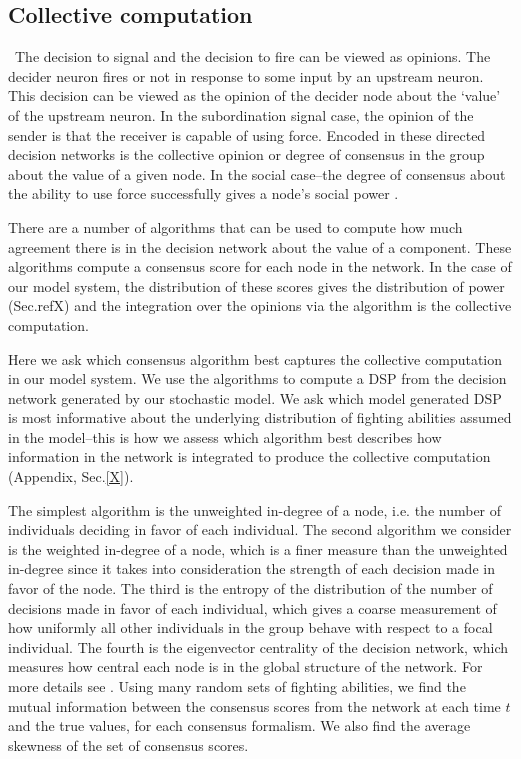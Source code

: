 \documentclass{article}
\begin{document}
\subsection*{Collective computation }
\label{computation}
\ The decision to signal and the decision to fire can be viewed as opinions. The decider neuron fires or not in response to some input by an upstream neuron. This decision can be viewed as the opinion of the decider node about the `value' of the upstream neuron. In the subordination signal case, the opinion of the sender is that the receiver is capable of using force. Encoded in these directed decision networks is the collective opinion or degree of consensus in the group about the value of a given node. In the social case--the degree of consensus about the ability to use force successfully gives a node's social power \cite{Brush:2013fk, Flack:2006uq}.

There are a number of algorithms that can be used to compute how much agreement there is in the decision network about the value of a component. These algorithms compute a consensus score for each node in the network. In the case of our model system, the distribution of these scores gives the distribution of power (Sec.refX) and the integration over the opinions via the algorithm is the collective computation. 

Here we ask which consensus algorithm best captures the collective computation in our model system. We use the algorithms to compute a DSP from the decision network generated by our stochastic model. We ask which model generated DSP is most informative about the underlying distribution of fighting abilities assumed in the model--this is how we assess which algorithm best describes how information in the network is integrated to produce the collective computation (Appendix, Sec.\ref{X}). 

The simplest algorithm is the unweighted in-degree of a node, i.e. the number of individuals deciding in favor of each individual.  The second algorithm we consider is the weighted in-degree of a node, which is a finer measure than the unweighted in-degree since it takes into consideration the strength of each decision made in favor of the node.  The third is the entropy of the distribution of the number of decisions made in favor of each individual, which gives a coarse measurement of how uniformly all other individuals in the group behave with respect to a focal individual.  The fourth is the eigenvector centrality of the decision network, which measures how central each node is in the global structure of the network.  For more details see \cite{Brush:2013fk}. Using many random sets of fighting abilities, we find the mutual information between the consensus scores from the network at each time $t$ and the true values, for each consensus formalism. We also find the average skewness of the set of consensus scores.
\end{document}
